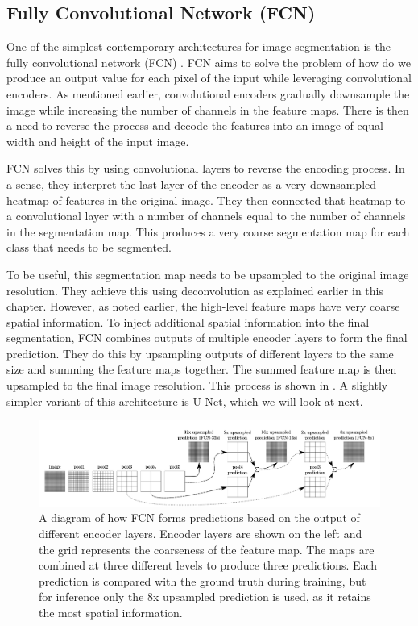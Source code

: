 \subsection{Fully Convolutional Network (FCN)}

One of the simplest contemporary architectures for image segmentation is the fully convolutional network (FCN) \cite{long2015fully}. FCN aims to solve the problem of how do we produce an output value for each pixel of the input while leveraging convolutional encoders. As mentioned earlier, convolutional encoders gradually downsample the image while increasing the number of channels in the feature maps. There is then a need to reverse the process and decode the features into an image of equal width and height of the input image. 

FCN solves this by using convolutional layers to reverse the encoding process. In a sense, they interpret the last layer of the encoder as a very downsampled heatmap of features in the original image. They then connected that heatmap to a convolutional layer with a number of channels equal to the number of channels in the segmentation map. This produces a very coarse segmentation map for each class that needs to be segmented. 

To be useful, this segmentation map needs to be upsampled to the original image resolution. They achieve this using deconvolution as explained earlier in this chapter. However, as noted earlier, the high-level feature maps have very coarse spatial information. To inject additional spatial information into the final segmentation, FCN combines outputs of multiple encoder layers to form the final prediction. They do this by upsampling outputs of different layers to the same size and summing the feature maps together. The summed feature map is then upsampled to the final image resolution. This process is shown in . A slightly simpler variant of this architecture is U-Net, which we will look at next.

\begin{figure}[h!]
 \centering
 \includegraphics[width=\linewidth]{images/fcn-arch}
 \caption{A diagram of how FCN forms predictions based on the output of different encoder layers. Encoder layers are shown on the left and the grid represents the coarseness of the feature map. The maps are combined at three different levels to produce three predictions. Each prediction is compared with the ground truth during training, but for inference only the 8x upsampled prediction is used, as it retains the most spatial information. \cite{long2015fully}}
 \label{fig:fcn-arch}
 \end{figure}
 
